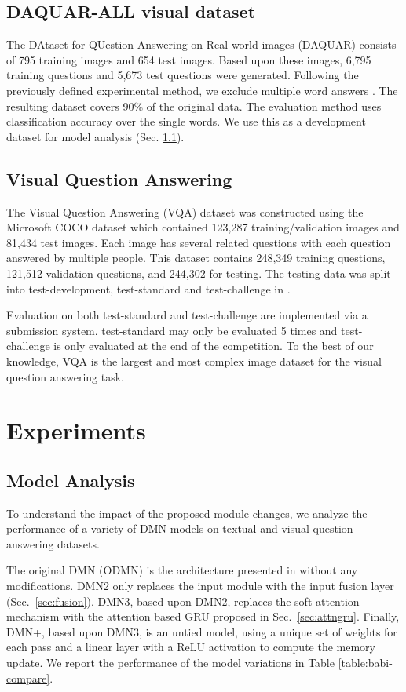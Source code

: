 \documentclass{article}
\begin{document}
\subsection{DAQUAR-ALL visual dataset}

The DAtaset for QUestion Answering on Real-world images (DAQUAR) \cite{Malinowski2014} consists of 795 training images and 654 test images.
Based upon these images, 6,795 training questions and 5,673 test questions were generated.
Following the previously defined experimental method, we exclude multiple word answers \cite{malinowski2015ask,ma2015learning}.
The resulting dataset covers 90\% of the original data.
The evaluation method uses classification accuracy over the single words.
We use this as a development dataset for model analysis (Sec. \ref{sec:model-analysis}).

\subsection{Visual Question Answering}
The Visual Question Answering (VQA) dataset was constructed using the Microsoft COCO dataset \cite{lin2014microsoft} which contained 123,287 training/validation images and 81,434 test images.
Each image has several related questions with each question answered by multiple people.
This dataset contains 248,349 training questions, 121,512 validation questions, and 244,302 for testing.
The testing data was split into test-development, test-standard and test-challenge in \citet{Antol2015}.

Evaluation on both test-standard and test-challenge are implemented via a submission system.
test-standard may only be evaluated 5 times and test-challenge is only evaluated at the end of the competition.
To the best of our knowledge, VQA is the largest and most complex image dataset for the visual question answering task.

\section{Experiments}
\subsection{Model Analysis} \label{sec:model-analysis}

To understand the impact of the proposed module changes, we analyze the performance of a variety of DMN models on textual and visual question answering datasets.

The original DMN (ODMN) is the architecture presented in \citet{Kumar2015} without any modifications.
DMN2 only replaces the input module with the input fusion layer (Sec.~\ref{sec:fusion}).
DMN3, based upon DMN2, replaces the soft attention mechanism with the attention based GRU proposed in Sec.~\ref{sec:attngru}.
Finally, DMN+, based upon DMN3, is an untied model, using a unique set of weights for each pass and a linear layer with a ReLU activation to compute the memory update.
We report the performance of the model variations in Table \ref{table:babi-compare}.
\end{document}
